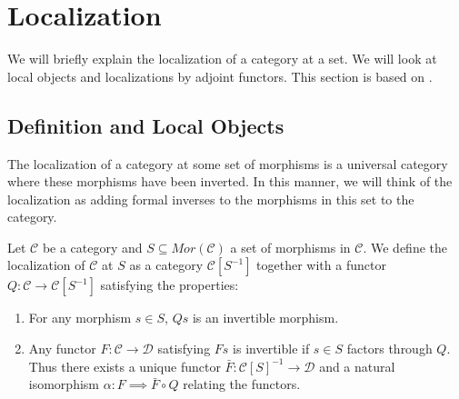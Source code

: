 \documentclass[../../../thesis.tex]{subfiles}
\begin{document}
    
    
    \section{Localization}
    
        We will briefly explain the localization of a category at a set. We will look at local objects and localizations by adjoint functors. This section is based on \cite{Krause21}.

        \subsection{Definition and Local Objects}

            The localization of a category at some set of morphisms is a universal category where these morphisms have been inverted. In this manner, we will think of the localization as adding formal inverses to the morphisms in this set to the category.

            \begin{definition}
                Let $\mathcal{C}$ be a category and $S \subseteq Mor(\mathcal{C})$ a set of morphisms in $\mathcal{C}$. We define the localization of $\mathcal{C}$ at $S$ as a category $\mathcal{C}[S^{-1}]$ together with a functor $Q : \mathcal{C} \rightarrow \mathcal{C}[S^{-1}]$ satisfying the properties:
                \begin{enumerate}
                    \item For any morphism $s\in S$, $Qs$ is an invertible morphism.
                    \item Any functor $F : \mathcal{C} \rightarrow \mathcal{D}$ satisfying $Fs$ is invertible if $s\in S$ factors through $Q$. Thus there exists a unique functor $\bar{F} : \mathcal{C}[S]^{-1} \rightarrow \mathcal{D}$ and a natural isomorphism $\alpha : F \implies \bar{F} \circ Q$ relating the functors.
                \end{enumerate}

                \begin{center}
                \end{center}
            \end{definition}
\end{document}
